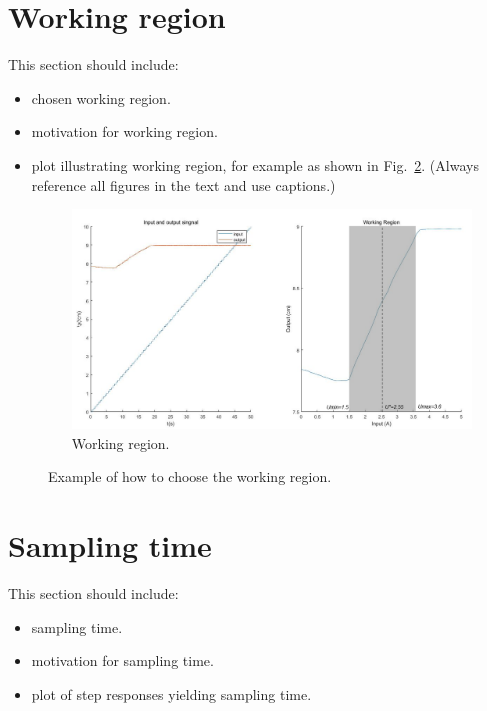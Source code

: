 \documentclass[10pt,a4paper]{article}
\begin{document}
\section{Working region}
This section should include:
\begin{itemize}
    \item chosen working region.
    \item motivation for working region.
    \item plot illustrating working region, for example as shown in Fig.~\ref{fig:workingRegion}. (Always reference all figures in the text and use captions.)
	\begin{figure}[ht]
		\footnotesize
		\centering 
		\includegraphics[width=\columnwidth]{findWorkingRegion.png} 
		\caption{Working region.}
		\label{fig:workingRegion}
	\end{figure}
\end{itemize}
%
\begin{figure}[ht]
	\footnotesize
	\centering 
	\def\svgwidth{.8\columnwidth}
	 
	\caption{Example of how to choose the working region.}
	\label{fig:workingRegion}
	\end{figure}

\section{Sampling time}
This section should include:
\begin{itemize}
    \item sampling time.
    \item motivation for sampling time.
    \item plot of step responses yielding sampling time.
\end{itemize}
\end{document}
